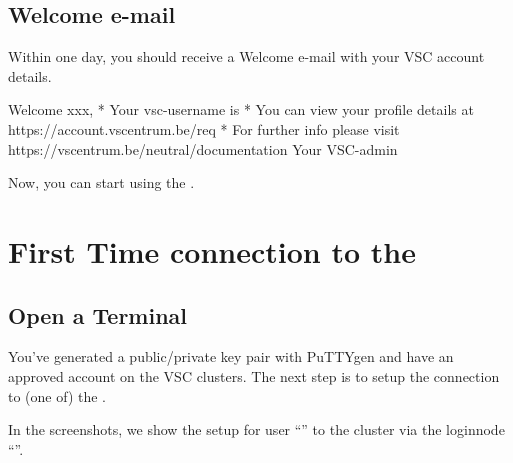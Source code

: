 \fi %
\fi %

\subsection{Welcome e-mail}
\label{sec:welcome-email}

Within one day, you should receive a Welcome e-mail with your VSC account details.

\begin{flattext}
Welcome xxx,
* Your vsc-username is %
* You can view your profile details at https://account.vscentrum.be/req
* For further info please visit https://vscentrum.be/neutral/documentation
Your VSC-admin
\end{flattext}

Now, you can start using the \hpc.

\section{First Time connection to the \hpc}
\label{sec:first-time-connection-to-the-hpc}

\ifwindows

  \subsection{Open a Terminal}
  \label{sec:windows-open-a-terminal}

  You've generated a public/private key pair with PuTTYgen and have an approved
  account on the VSC clusters.  The next step is to setup the connection to (one
  of) the \hpc.

  In the screenshots, we show the setup for user ``''
  to the \hpc cluster via the loginnode
  ``\strong{\emph{\loginnode}}''.


